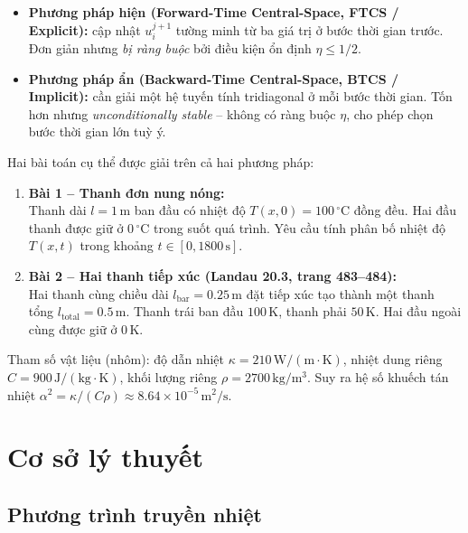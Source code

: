 \documentclass[12pt,a4paper]{article}
\begin{document}
\begin{itemize}
    \item \textbf{Phương pháp hiện (Forward-Time Central-Space, FTCS / Explicit):} cập nhật $u_i^{j+1}$ tường minh từ ba giá trị ở bước thời gian trước. Đơn giản nhưng \emph{bị ràng buộc} bởi điều kiện ổn định $\eta \le 1/2$.
    \item \textbf{Phương pháp ẩn (Backward-Time Central-Space, BTCS / Implicit):} cần giải một hệ tuyến tính tridiagonal ở mỗi bước thời gian. Tốn hơn nhưng \emph{unconditionally stable} -- không có ràng buộc $\eta$, cho phép chọn bước thời gian lớn tuỳ ý.
\end{itemize}

Hai bài toán cụ thể được giải trên cả hai phương pháp:

\begin{enumerate}
    \item \textbf{Bài 1 -- Thanh đơn nung nóng:}\\
    Thanh dài $l = 1\,\mathrm{m}$ ban đầu có nhiệt độ $T(x, 0) = 100\,^\circ\mathrm{C}$ đồng đều. Hai đầu thanh được giữ ở $0\,^\circ\mathrm{C}$ trong suốt quá trình. Yêu cầu tính phân bố nhiệt độ $T(x, t)$ trong khoảng $t \in [0, 1800\,\mathrm{s}]$.

    \item \textbf{Bài 2 -- Hai thanh tiếp xúc (Landau 20.3, trang 483--484):}\\
    Hai thanh cùng chiều dài $l_{\text{bar}} = 0.25\,\mathrm{m}$ đặt tiếp xúc tạo thành một thanh tổng $l_{\text{total}} = 0.5\,\mathrm{m}$. Thanh trái ban đầu $100\,\mathrm{K}$, thanh phải $50\,\mathrm{K}$. Hai đầu ngoài cùng được giữ ở $0\,\mathrm{K}$.
\end{enumerate}

Tham số vật liệu (nhôm): độ dẫn nhiệt $\kappa = 210\,\mathrm{W/(m\cdot K)}$, nhiệt dung riêng $C = 900\,\mathrm{J/(kg\cdot K)}$, khối lượng riêng $\rho = 2700\,\mathrm{kg/m^3}$. Suy ra hệ số khuếch tán nhiệt $\alpha^2 = \kappa/(C\rho) \approx 8.64\times 10^{-5}\,\mathrm{m^2/s}$.

\section{Cơ sở lý thuyết}

\subsection{Phương trình truyền nhiệt}
\end{document}
